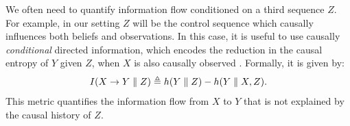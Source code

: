 
We often need to quantify information flow conditioned on a third sequence $Z$. 
For example, in our setting $Z$ will be the control sequence which causally influences both beliefs and observations.
In this case, it is useful to use causally \textit{conditional} directed information, which encodes the reduction in the causal entropy of $Y$ given $Z$, when $X$ is also causally observed \cite[Def.~3.7]{kramer1998directed}.
Formally, it is given by:
\begin{equation}
    I(X \rightarrow Y \parallel Z) \triangleq h(Y \parallel Z) - h(Y \parallel X, Z).
    \label{eq:causal_cond_directed_info}
\end{equation}
This metric quantifies the information flow from $X$ to $Y$ that is not explained by the causal history of $Z$.

